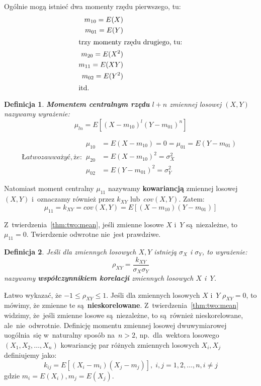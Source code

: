 \documentclass[10pt,a4paper]{article}
\newtheorem{definition}{Definicja}[section]
\numberwithin{equation}{subsection}
\begin{document}
Ogólnie mogą istnieć dwa momenty rzędu pierwszego, tu:
\begin{align*}
  m_{10} = E(X) \\
  m_{01} = E(Y) \\
  \shortintertext{trzy momenty rzędu drugiego, tu:}
  m_{20} = E(X^2) \\
  m_{11} = E(XY) \\
  m_{02} = E(Y^2) \\
  \shortintertext{itd.}
\end{align*}

\begin{definition}
  \textbf{Momentem centralnym rzędu} $l+n$ zmiennej losowej $(X,Y)$ nazywamy
  wyrażenie:
  \begin{equation}
    \mu_{ln} = E[(X-m_{10})^l(Y-m_{01})^n]
  \end{equation}
\end{definition}

\begin{subequations}
  Łatwo zauważyć, że:
  \begin{align}
    \mu_{10} &= E(X-m_{10}) = 0 = \mu_{01} = E(Y-m_{01}) \\
    \mu_{20} &= E(X-m_{10})^2 = \sigma_X^2 \\
    \mu_{02} &= E(Y-m_{01})^2 = \sigma_Y^2
  \end{align}
\end{subequations}

Natomiast moment centralny $\mu_{11}$ nazywamy \textbf{kowariancją} zmiennej
losowej $(X,Y)$ i~oznaczamy również przez $k_{XY}$ lub~$cov(X,Y)$. Zatem:
\begin{equation}
  \mu_{11} = k_{XY} = cov(X,Y) = E[(X-m_{10})(Y-m_{01})]
\end{equation}

Z~twierdzenia~\ref{thm:two:mean}, jeśli zmienne losowe $X$ i~$Y$ są~niezależne,
to $\mu_{11} = 0$. Twierdzenie odwrotne nie~jest prawdziwe.

\begin{definition}
  Jeśli dla zmiennych losowych $X, Y$ istnieją $\sigma_X$ i $\sigma_Y$,
  to wyrażenie:
  \begin{equation}
    \rho_{XY} = \frac{k_{XY}}{\sigma_X\sigma_Y}
  \end{equation}
  nazywamy \textbf{współczynnikiem korelacji} zmiennych losowych $X$ i~$Y$.
\end{definition}

Łatwo wykazać, że $-1\leq \rho_{XY} \leq 1$. Jeśli dla zmiennych losowych $X$
i~$Y$ $\rho_{XY} = 0$, to mówimy, że zmienne te są~\textbf{nieskorelowane}.
Z~twierdzenia~\ref{thm:two:mean} widzimy, że~jeśli zmienne losowe są~niezależne,
to są~również nieskorelowane, ale~nie~odwrotnie. Definicję momentu zmiennej
losowej dwuwymiarowej uogólnia~się w~naturalny sposób na~$n>2$, np.~dla~wektora
losowego $(X_1, X_2,\dotsc, X_n)$ kowariancję par różnych zmiennych losowych
$X_i,X_j$ definiujemy jako:
\begin{equation}
  k_{ij}=E[(X_i-m_i)(X_j-m_j)],\;i,j=1,2,\dotsc,n, i\neq j
\end{equation}
gdzie $m_i = E(X_i), m_j = E(X_j)$.
\end{document}

